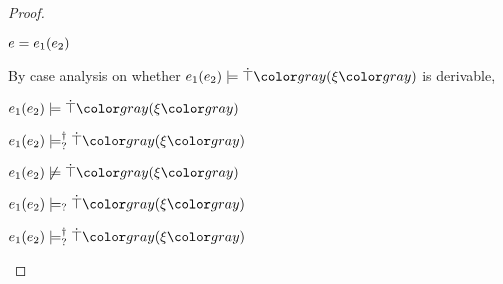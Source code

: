 \begin{proof}
\begin{byCases}
  \item[\text{(\ref{rule:CMSAp})}]
    \begin{pfsteps*}
    \item $e = e_1(e_2)$  
    \end{pfsteps*}
    By case analysis on whether $\csatisfy{\hap{e_1}{e_2}}{\ctruify{\xi}}$ is derivable,
    \begin{byCases}
    \item[\text{$\csatisfy{\hap{e_1}{e_2}}{\ctruify{\xi}}$ is derivable}]
      \begin{pfsteps*}
      \item $\csatisfy{\hap{e_1}{e_2}}{\ctruify{\xi}}$  
      \item $\csatisfyormay{\hap{e_1}{e_2}}{\ctruify{\xi}}$ 
      \end{pfsteps*}
    \item[\text{$\csatisfy{\hap{e_1}{e_2}}{\ctruify{\xi}}$ is not derivable}]
      \begin{pfsteps*}
      \item $\cnotsatisfy{\hap{e_1}{e_2}}{\ctruify{\xi}}$  
      \item $\cmaysatisfy{\hap{e_1}{e_2}}{\ctruify{\xi}}$  
      \item $\csatisfyormay{\hap{e_1}{e_2}}{\ctruify{\xi}}$ 
      \end{pfsteps*}
    \end{byCases}


\end{byCases}
\end{proof}
